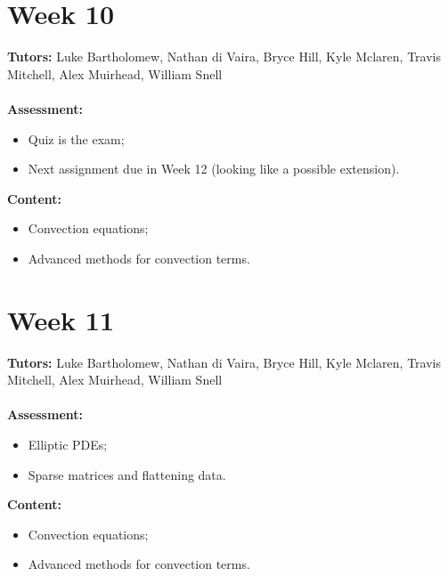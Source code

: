 \documentclass[11pt,a4paper]{report}
\begin{document}
	
	\begingroup
	\makeatletter
	\let\clearpage\relax
	\vspace*{\fill}%
	\vspace*{\dimexpr-50\p@-\baselineskip}
	\chapter*{Week 10}
	\textbf{Tutors:} Luke Bartholomew, Nathan di Vaira, Bryce Hill, Kyle Mclaren, Travis Mitchell, Alex Muirhead, William Snell \\\\
	\textbf{Assessment:} 
	\begin{itemize}
		\item Quiz is the exam;
		\item Next assignment due in Week 12 (looking like a possible extension). 
	\end{itemize}	
	\textbf{Content:}
	\begin{itemize}
		\item Convection equations;
		\item Advanced methods for convection terms.
	\end{itemize}
	\vspace*{\fill}
	\endgroup
	
	
	
		\begingroup
	\makeatletter
	\let\clearpage\relax
	\vspace*{\fill}%
	\vspace*{\dimexpr-50\p@-\baselineskip}
	\chapter*{Week 11}
	\textbf{Tutors:} Luke Bartholomew, Nathan di Vaira, Bryce Hill, Kyle Mclaren, Travis Mitchell, Alex Muirhead, William Snell \\\\
	\textbf{Assessment:} 
	\begin{itemize}
		\item Elliptic PDEs;
		\item Sparse matrices and flattening data. 
	\end{itemize}	
	\textbf{Content:}
	\begin{itemize}
		\item Convection equations;
		\item Advanced methods for convection terms.
	\end{itemize}
	\vspace*{\fill}
	\endgroup
	
	
\end{document}
